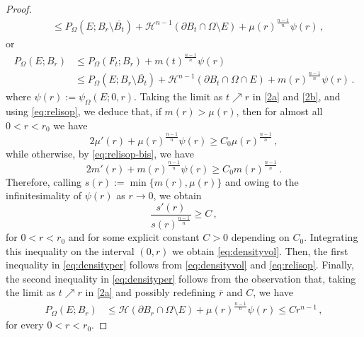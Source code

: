 \documentclass[a4paper,reqno,11pt]{amsart}
\newcommand{\Hau}{{\mathcal H}} %
\newcommand{\de}{\partial}
\newcommand{\pr}{P_{\Omega}}
\begin{document}
\begin{proof}
\begin{align}
			\nonumber & \leq \pr(E;B_{r} \setminus \overline{B_{t}}) +  \Hau^{n-1}(\de B_{t} \cap \Omega \setminus E) + \mu(r)^{\frac{n-1}{n}} \psi(r) \, ,
		\end{align}
		or
		\begin{align} \label{2b}
			\pr(E;B_{r}) & \leq \pr(F_{t};B_{r}) + m(t)^{\frac{n-1}{n}} \psi(r) \\ 
			\nonumber & \leq \pr(E;B_{r} \setminus \overline{B_{t}}) + \Hau^{n-1}(\de B_{t} \cap \Omega \cap E) + m(r)^{\frac{n-1}{n}} \psi(r) \, .
		\end{align}
		where $\psi(r) := \psi_{\Omega}(E;0,r)$. Taking the limit as $t \nearrow r$ in \eqref{2a} and \eqref{2b}, and using \eqref{eq:relisop}, we deduce that, if $m(r) > \mu(r)$, then for almost all $0<r<r_{0}$ we have
		\begin{equation*}
			2\mu'(r) + \mu(r)^{\frac{n-1}{n}} \psi(r) \geq C_{0} \mu(r)^{\frac{n-1}{n}} \, ,
		\end{equation*}
		while otherwise, by \eqref{eq:relisop-bis}, we have
		\begin{equation*}
			2m'(r) + m(r)^{\frac{n-1}{n}} \psi(r) \geq C_{0} 
			m(r)^{\frac{n-1}{n}}\,.
		\end{equation*}
		Therefore, calling $s(r) := \min \{ m(r), \mu(r) \}$ and owing to the infinitesimality of $\psi(r)$ as $r\to 0$, we obtain
		\begin{equation*}
			\dfrac{s'(r)}{s(r)^{\frac{n-1}{n}}} \geq C \, ,
		\end{equation*}
		for $0 < r < r_{0}$ and for some explicit constant $C > 0$ depending on $C_{0}$. Integrating this inequality on the interval $(0,r)$ we obtain \eqref{eq:densityvol}. Then, the first inequality in \eqref{eq:densityper} follows from \eqref{eq:densityvol} and \eqref{eq:relisop}. Finally, the second inequality in \eqref{eq:densityper} follows from the observation that, taking the limit as $t \nearrow r$ in \eqref{2a} and possibly redefining $\overline{r}$ and $C$, we have
		\begin{align*}
			\pr(E;B_{r}) & \leq \Hau(\de B_{r} \cap \Omega \setminus E) + \mu(r)^{\frac{n-1}{n}} \psi(r) \leq C r^{n-1} \, ,
		\end{align*}
		for every $0 < r < r_{0}$.
\end{proof}

	
\end{document}

